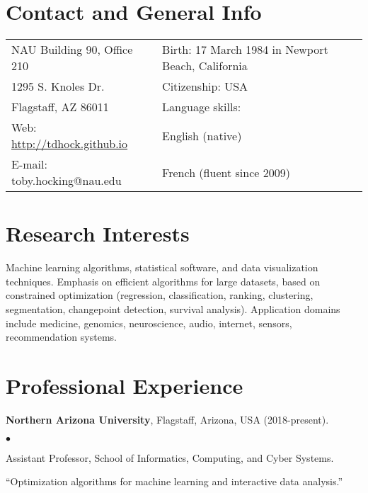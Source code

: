 \documentclass[margin,line]{res}
\newenvironment{list2}{
  \begin{list}{$\bullet$}{%
      \setlength{\itemsep}{0in}
      \setlength{\parsep}{0in} \setlength{\parskip}{0in}
      \setlength{\topsep}{0in} \setlength{\partopsep}{0in} 
      \setlength{\leftmargin}{0.2in}}}{\end{list}}
\begin{document}

\begin{resume}
\section{\sc Contact and General Info}
\vspace{.05in}
\begin{tabular*}{6.1in} {@{\extracolsep{\fill}}ll}
 NAU Building 90, Office 210 & Birth: 17 March 1984 in Newport Beach, California\\
 1295 S. Knoles Dr.  & Citizenship: USA \\            
  Flagstaff, AZ 86011 & Language skills:\\
  Web: \url{http://tdhock.github.io} & English (native)\\
  E-mail:  toby.hocking@nau.edu & French (fluent since 2009)\\
\end{tabular*}

\section{\sc Research Interests}

Machine learning algorithms, statistical software, and data
visualization techniques. Emphasis on efficient algorithms for large
datasets, based on constrained optimization (regression,
classification, ranking, clustering, segmentation, changepoint
detection, survival analysis). Application domains include medicine,
genomics, neuroscience, audio, internet, sensors, recommendation
systems.

\section{\sc Professional Experience}

{\bf Northern Arizona University}, Flagstaff, Arizona, USA (2018-present).\\
\vspace*{-.1in}
\begin{list2}
\item[] Assistant Professor, School of Informatics, Computing, and Cyber Systems.
\item[] ``Optimization algorithms for machine learning and interactive data analysis.''
\end{list2}


\end{resume}
\end{document}
